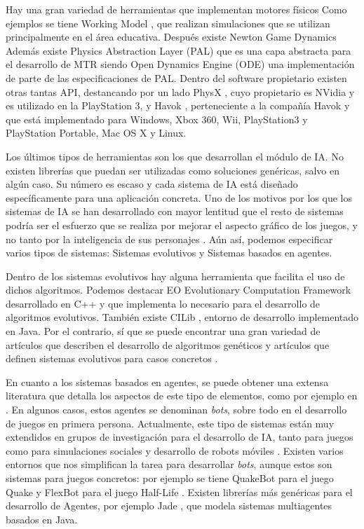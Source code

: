\documentclass{egpubl}
\begin{document}
Hay una gran variedad de herramientas que implementan
motores f\'isicos  Como ejemplos se tiene Working Model \cite{WModel},
que realizan simulaciones que se utilizan principalmente en el \'area educativa.
Despu\'es existe Newton Game Dynamics \cite{NGDynamics} Adem\'as existe  Physics Abstraction Layer (PAL) \cite{PAL} 
que es una capa abstracta para el desarrollo de MTR siendo Open Dynamics Engine (ODE) \cite{ODE}
una implementaci\'on de parte de las especificaciones de PAL. Dentro del software propietario 
existen otras tantas API, destancando por un lado PhysX \cite{Physx}, cuyo propietario es NVidia y
es utilizado en la PlayStation 3, y Havok \cite{Havok}, perteneciente a
la compa\~n\'ia Havok y que est\'a implementado para Windows, Xbox 360,
Wii, PlayStation3 y PlayStation Portable, Mac OS X y Linux.

Los \'ultimos tipos de herramientas son los que desarrollan el m\'odulo
de IA. No existen librer\'ias que puedan ser utilizadas como soluciones 
gen\'ericas, salvo en alg\'un caso. Su n\'umero es escaso y cada sistema 
de IA est\'a dise\~nado
espec\'ificamente para una aplicaci\'on concreta. Uno de los motivos
por los que los sistemas de IA se han desarrollado con mayor lentitud
que el resto de sistemas podr\'ia ser el esfuerzo que se realiza por
mejorar el aspecto gr\'afico de los juegos, y no tanto por la
inteligencia de sus personajes \cite{Laird2001}. A\'un as\'i, podemos especificar
varios tipos de sistemas: Sistemas evolutivos y Sistemas basados en
agentes.

Dentro de los sistemas evolutivos hay alguna herramienta que facilita
el uso de dichos algoritmos. Podemos destacar EO Evolutionary Computation Framework
\cite{EOECF} desarrollado en C++ y que implementa lo necesario para el
desarrollo de algoritmos evolutivos. Tambi\'en existe CILib
\cite{CILib}, entorno de desarrollo implementado en Java. Por el
contrario, s\'i que se puede encontrar una gran variedad de art\'iculos
que describen el desarrollo de algoritmos gen\'eticos y art\'iculos que
definen sistemas evolutivos para casos concretos \cite{Georgios2004,Chris2007,Robert2005}.

En cuanto a los sistemas basados en agentes, se puede obtener una
extensa literatura que detalla los aspectos de este tipo de elementos,
como por ejemplo en \cite{Wooldridge1997,Wood2000}. En algunos casos, estos agentes se
denominan \textit{bots}, sobre todo en el desarrollo de juegos en
primera persona. Actualmente, este tipo de sistemas est\'an muy
extendidos en grupos de investigaci\'on para el desarrollo de IA, tanto
para juegos como para simulaciones sociales y desarrollo de robots
m\'oviles \cite{John2007,Kenyon2006}. Existen varios entornos que nos simplifican la
tarea para desarrollar \textit{bots}, aunque estos son sistemas para
juegos concretos: por ejemplo se tiene QuakeBot para el juego Quake y
FlexBot para el juego Half-Life \cite{Laird2001,Aaron2002}. Existen librer\'ias m\'as
gen\'ericas para el desarrollo de Agentes, por ejemplo Jade
\cite{Jade}, que modela sistemas multiagentes basados en Java. 
\end{document}
